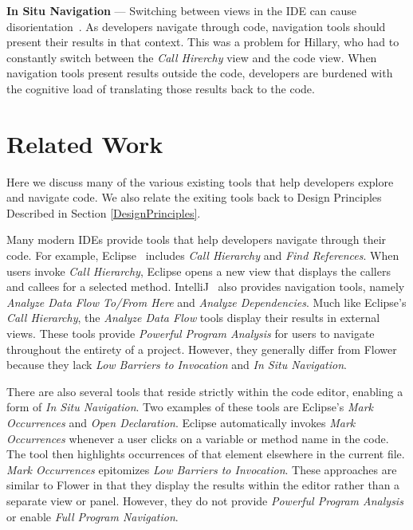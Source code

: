 \documentclass[conference]{IEEEtran}
\begin{document}
\vspace{1em} 
\noindent\textbf{In Situ Navigation}  ---
Switching between views in the IDE can cause disorientation~\cite{deAlwis2006disorient}. 
As developers navigate through code, navigation tools should present their results in that context. 
This was a problem for Hillary, who had to constantly switch between the \emph{Call Hirerchy} view and the code view.
When navigation tools present results outside the code, developers are burdened with the cognitive load of translating those results back to the code.

\section{Related Work}
Here we discuss many of the various existing tools that help developers explore and navigate code. We also relate the exiting tools back to Design Principles Described in Section \ref{DesignPrinciples}.

Many modern IDEs provide tools that help developers navigate through their code. 
For example, Eclipse~\cite{Eclipse} includes \emph{Call Hierarchy} and \emph{Find References}. 
When users invoke \emph{Call Hierarchy}, Eclipse opens a new view that displays the callers and callees for a selected method.  
IntelliJ~\cite{IntelliJ} also provides navigation tools, namely \emph{Analyze Data Flow To/From Here} and \emph{Analyze Dependencies}.
Much like Eclipse's \emph{Call Hierarchy}, the \emph{Analyze Data Flow} tools display their results in external views. 
These tools provide \textit{Powerful Program Analysis} for users to navigate throughout the entirety of a project. 
However, they generally differ from Flower because they lack \textit{Low Barriers to Invocation} and \textit{In Situ Navigation}.

There are also several tools that reside strictly within the code editor, enabling a form of \textit{In Situ Navigation}.
Two examples of these tools are Eclipse's \emph{Mark Occurrences} and \emph{Open Declaration}. 
Eclipse automatically invokes \emph{Mark Occurrences} whenever a user clicks on a variable or method name in the code.
The tool then highlights occurrences of that element elsewhere in the current file.
\emph{Mark Occurrences} epitomizes \textit{Low Barriers to Invocation}.
These approaches are similar to Flower  in that they display the results within the editor rather than a separate view or panel.
However, they do not provide \textit{Powerful Program Analysis} or enable \textit{Full Program Navigation}.
\end{document}
